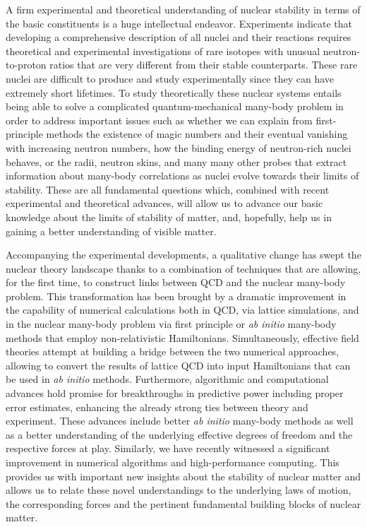 A firm experimental and theoretical understanding of nuclear stability
in terms of the basic constituents is a huge intellectual endeavor.
Experiments indicate that developing a comprehensive description of
all nuclei and their reactions requires theoretical and experimental
investigations of rare isotopes with unusual neutron-to-proton ratios
that are very different from their stable counterparts.  These rare
nuclei are difficult to produce and study experimentally since they
can have extremely short lifetimes. 
To study theoretically these nuclear systems  entails 
being able to solve a complicated quantum-mechanical many-body problem
in order to address important 
issues such as whether we can explain from first-principle
methods the existence of magic numbers and their eventual vanishing with increasing neutron numbers, 
how the binding energy of neutron-rich nuclei
behaves, or the radii, neutron skins, and many many other probes that
extract information about many-body correlations as nuclei evolve
towards their limits of stability. These are all fundamental
questions which, combined with recent experimental and theoretical
advances, will allow us to advance our basic knowledge about the
limits of stability of matter, and, hopefully, help us in gaining a
better understanding of visible matter.


Accompanying the experimental  developments, a qualitative change has swept the
nuclear theory landscape thanks to a combination of techniques that are
allowing, for the first time, to construct links between QCD and
the nuclear many-body problem. This transformation has been brought by a dramatic
improvement in the capability of numerical calculations both in QCD,
via lattice simulations, and in the nuclear many-body problem via first principle or {\em ab initio} 
many-body methods that employ non-relativistic
Hamiltonians. Simultaneously, effective field
theories attempt at building  a bridge between the two numerical approaches,
allowing to convert the results of lattice QCD into input Hamiltonians that can be used in {\em ab initio}
methods.
Furthermore,
algorithmic and computational advances hold promise for
breakthroughs in predictive power including proper error estimates,
enhancing the already strong ties between theory and experiment.
These advances include better {\em ab initio} many-body methods as well as a
better understanding of the underlying effective degrees of freedom
and the respective forces at play.  Similarly, we have recently witnessed a significant improvement in numerical
algorithms and high-performance computing.
This provides us with important new insights about the stability
of nuclear matter and allows us to relate these novel understandings to
the underlying laws of motion, the corresponding forces and the
pertinent fundamental building blocks of nuclear matter.


